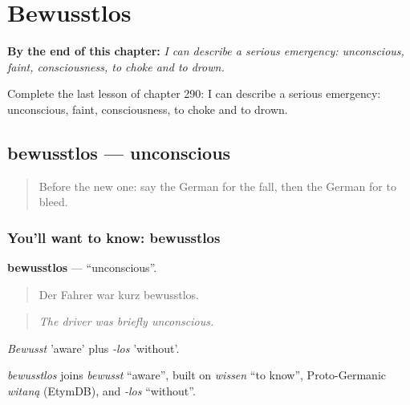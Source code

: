 
\chapter{Bewusstlos}
\label{ch:ge-bewusstlos}

\begin{chapteropening}
\textbf{By the end of this chapter:} \emph{I can describe a serious emergency: unconscious, faint, consciousness, to choke and to drown.}

Complete the last lesson of chapter 290: I can describe a serious emergency: unconscious, faint, consciousness, to choke and to drown.
\end{chapteropening}

\section[bewusstlos]{bewusstlos — unconscious}

\label{lesson:GE-C290-bewusstlos}



\begin{quote}
Before the new one: say the German for the fall, then the German for to bleed.
\end{quote}

\subsection*{You'll want to know: bewusstlos}
\textbf{bewusstlos} — \textquotedblleft{}unconscious\textquotedblright{}.

\begin{quote}
Der Fahrer war kurz bewusstlos.
\end{quote}

\begin{quote}
\emph{The driver was briefly unconscious.}
\end{quote}

\emph{Bewusst} 'aware' plus \emph{-los} 'without'.

\begin{cousinweb}
\emph{bewusstlos} joins \emph{bewusst} \textquotedblleft{}aware\textquotedblright{}, built on \emph{wissen} \textquotedblleft{}to know\textquotedblright{}, Proto-Germanic \emph{witaną} (EtymDB), and \emph{-los} \textquotedblleft{}without\textquotedblright{}.
\end{cousinweb}

